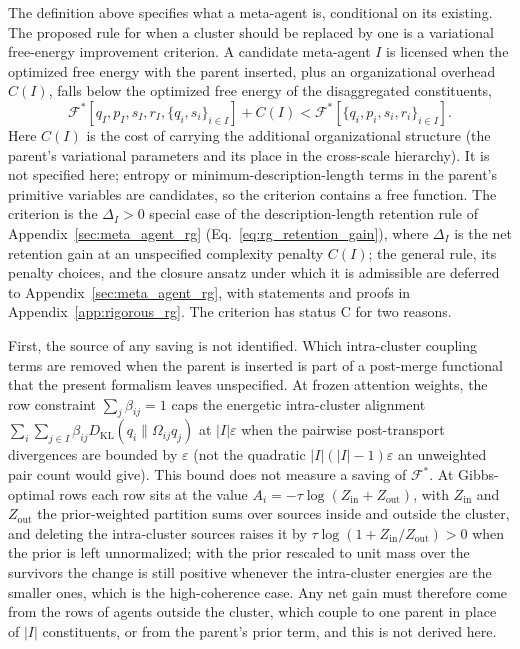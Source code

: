 The definition above specifies what a meta-agent is, conditional on its existing. The proposed rule for when a cluster should be replaced by one is a variational free-energy improvement criterion. A candidate meta-agent $I$ is licensed when the optimized free energy with the parent inserted, plus an organizational overhead $C(I)$, falls below the optimized free energy of the disaggregated constituents,
\begin{equation}
\mathcal{F}^*[q_I, p_I, s_I, r_I, \{q_i, s_i\}_{i \in I}] + C(I) < \mathcal{F}^*[\{q_i, p_i, s_i, r_i\}_{i \in I}].
\label{eq:meta_agent_FE_criterion}
\end{equation}
Here $C(I)$ is the cost of carrying the additional organizational structure (the parent's variational parameters and its place in the cross-scale hierarchy). It is not specified here; entropy or minimum-description-length terms in the parent's primitive variables are candidates, so the criterion contains a free function. The criterion is the $\Delta_I > 0$ special case of the description-length retention rule of Appendix~\ref{sec:meta_agent_rg} (Eq.~\eqref{eq:rg_retention_gain}), where $\Delta_I$ is the net retention gain at an unspecified complexity penalty $C(I)$; the general rule, its penalty choices, and the closure ansatz under which it is admissible are deferred to Appendix~\ref{sec:meta_agent_rg}, with statements and proofs in Appendix~\ref{app:rigorous_rg}. The criterion has status C for two reasons.

First, the source of any saving is not identified. Which intra-cluster coupling terms are removed when the parent is inserted is part of a post-merge functional that the present formalism leaves unspecified. At frozen attention weights, the row constraint $\sum_j \beta_{ij} = 1$ caps the energetic intra-cluster alignment $\sum_i \sum_{j \in I} \beta_{ij} D_{\mathrm{KL}}(q_i \| \Omega_{ij} q_j)$ at $|I|\varepsilon$ when the pairwise post-transport divergences are bounded by $\varepsilon$ (not the quadratic $|I|(|I|-1)\varepsilon$ an unweighted pair count would give). This bound does not measure a saving of $\mathcal{F}^*$. At Gibbs-optimal rows each row sits at the value $A_i = -\tau\log(Z_{\mathrm{in}} + Z_{\mathrm{out}})$, with $Z_{\mathrm{in}}$ and $Z_{\mathrm{out}}$ the prior-weighted partition sums over sources inside and outside the cluster, and deleting the intra-cluster sources raises it by $\tau\log(1 + Z_{\mathrm{in}}/Z_{\mathrm{out}}) > 0$ when the prior is left unnormalized; with the prior rescaled to unit mass over the survivors the change is still positive whenever the intra-cluster energies are the smaller ones, which is the high-coherence case. Any net gain must therefore come from the rows of agents outside the cluster, which couple to one parent in place of $|I|$ constituents, or from the parent's prior term, and this is not derived here.

